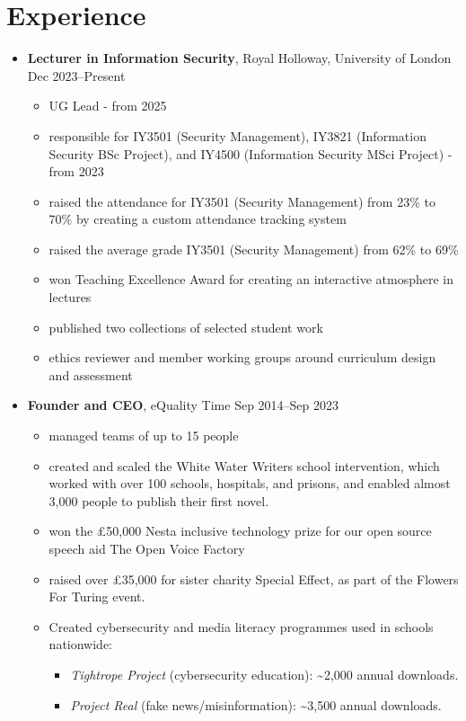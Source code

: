 \section*{Experience}

\begin{itemize}
  \item \textbf{Lecturer in Information Security}, Royal Holloway, University of London \hfill Dec 2023--Present
  \begin{itemize}
    \item UG Lead - from 2025 
    \item responsible for IY3501 (Security Management), IY3821 (Information Security BSc Project), and IY4500 (Information Security MSci Project) - from 2023
    \item raised the attendance for IY3501 (Security Management) from 23\% to 70\% by creating a custom attendance tracking system
    \item raised the average grade IY3501 (Security Management) from 62\% to 69\%
    \item won Teaching Excellence Award for creating an interactive atmosphere in lectures
    \item published two collections of selected student work
    \item ethics reviewer and member working groups around curriculum design and assessment
  \end{itemize}

  \item \textbf{Founder and CEO}, eQuality Time \hfill Sep 2014--Sep 2023
  \begin{itemize}
    \item managed teams of up to 15 people 
    \item created and scaled the White Water Writers school intervention, which worked with over 100 schools, hospitals, and prisons, and enabled almost 3,000 people to publish their first novel.  
    \item won the £50,000 Nesta inclusive technology prize for our open source speech aid The Open Voice Factory 
    \item raised over £35,000 for sister charity Special Effect, as part of the Flowers For Turing event. 
  \item Created cybersecurity and media literacy programmes used in schools nationwide:
      \begin{itemize}
        \item \textit{Tightrope Project} (cybersecurity education): \textasciitilde2,000 annual downloads.
        \item \textit{Project Real} (fake news/misinformation): \textasciitilde3,500 annual downloads.
      \end{itemize}
  \end{itemize}


\end{itemize}
